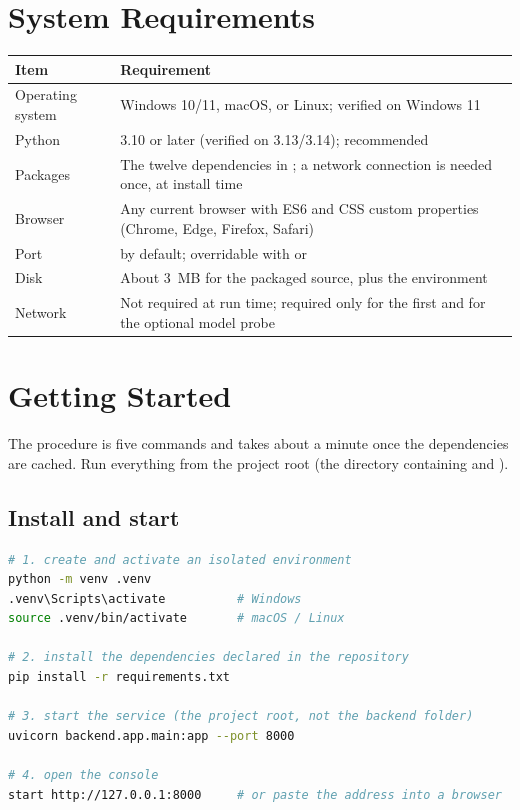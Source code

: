 \documentclass[11pt,a4paper]{article}
\newcommand{\code}[1]{\texttt{\small\detokenize{#1}}}
\begin{document}
\section{System Requirements}
\label{sec:req}

\begin{tabularx}{\textwidth}{@{}lX@{}}
\toprule
\textbf{Item} & \textbf{Requirement} \\
\midrule
Operating system & Windows 10/11, macOS, or Linux; verified on Windows 11 \\
Python & 3.10 or later (verified on 3.13/3.14); \code{venv} recommended \\
Packages & The twelve dependencies in \code{requirements.txt}; a network connection is needed once, at install time \\
Browser & Any current browser with ES6 and CSS custom properties (Chrome, Edge, Firefox, Safari) \\
Port & \code{8000} by default; overridable with \code{--port} or \code{PORT} \\
Disk & About 3~MB for the packaged source, plus the environment \\
Network & Not required at run time; required only for the first \code{pip install} and for the optional model probe \\
\bottomrule
\end{tabularx}

\section{Getting Started}
\label{sec:start}

The procedure is five commands and takes about a minute once the dependencies are cached.
Run everything from the project root (the directory containing \code{backend/} and \code{frontend/}).

\subsection{Install and start}

\begin{lstlisting}[language=bash]
# 1. create and activate an isolated environment
python -m venv .venv
.venv\Scripts\activate          # Windows
source .venv/bin/activate       # macOS / Linux

# 2. install the dependencies declared in the repository
pip install -r requirements.txt

# 3. start the service (the project root, not the backend folder)
uvicorn backend.app.main:app --port 8000

# 4. open the console
start http://127.0.0.1:8000     # or paste the address into a browser
\end{lstlisting}
\end{document}
